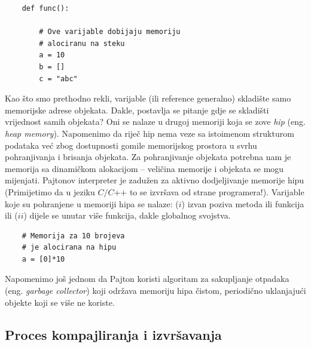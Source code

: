 \begin{verbatim}
	def func():
	
		# Ove varijable dobijaju memoriju 
		# alociranu na steku 
		a = 10
		b = []
		c = "abc"
\end{verbatim}

Kao što smo prethodno rekli, varijable (ili reference generalno) skladište samo memorijske adrese objekata. Dakle, postavlja se pitanje gdje se skladišti vrijednost samih objekata? Oni se nalaze u drugoj memoriji koja se zove \textit{hip} (eng. \textit{heap memory}). Napomenimo da riječ hip nema veze sa istoimenom strukturom podataka  već  zbog dostupnosti gomile memorijskog prostora u svrhu pohranjivanja i brisanja objekata.   Za pohranjivanje objekata potrebna nam je memorija sa dinamičkom alokacijom  -- veličina memorije i objeka\-ta se mogu mijenjati. Pajtonov interpreter je zadužen za aktivno dodjeljivanje memorije hipu (Primijetimo da u jeziku $C/C$++ to  se izvršava od strane progra\-mera!). Varijable koje su pohranjene u memoriji hipa se nalaze: ($i$)   izvan poziva metoda ili funkcija ili ($ii$) dijele se unutar više funkcija, dakle globalnog svojstva.

\begin{verbatim}
	# Memorija za 10 brojeva
	# je alocirana na hipu
	a = [0]*10     
\end{verbatim}


Napomenimo još jednom da Pajton koristi algoritam za sakupljanje otpadaka (eng. \textit{garbage collector}) koji održava memoriju hipa čistom, periodično uklanjajući  objekte koji se više ne koriste.




\subsection{Proces kompajliranja i izvršavanja}

